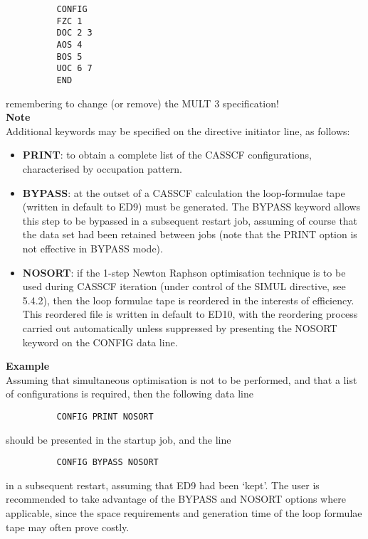 \documentclass[11pt,fleqn]{article}
\begin{document}
{
\footnotesize
\begin{verbatim}
          CONFIG
          FZC 1
          DOC 2 3
          AOS 4
          BOS 5
          UOC 6 7
          END
\end{verbatim}
}
remembering to change (or remove) the MULT 3 specification!\\

{\bf Note}\\

 Additional keywords may be specified on the directive
initiator line, as follows:
\begin{itemize}

\item {\bf PRINT}: to obtain a complete list of the CASSCF configurations,
characterised by occupation pattern.

\item {\bf BYPASS}: at the outset of a CASSCF calculation the loop-formulae tape
(written in default to ED9) must be generated. The BYPASS keyword
allows this step to be bypassed in a subsequent restart job, assuming
of course that the data set had been retained between jobs (note that
the PRINT option is not effective in BYPASS mode).

\item {\bf  NOSORT}: if the 1-step Newton Raphson optimisation technique
is to be used during CASSCF iteration (under control of
the SIMUL directive, see 5.4.2), then the loop formulae
tape is reordered in the interests of efficiency. This reordered
file is written in default to ED10, with the reordering
process carried out automatically unless suppressed by
presenting the NOSORT keyword on the CONFIG data line.
\end{itemize}

{\bf Example}\\

Assuming that simultaneous optimisation is not to be performed, and
that a list of configurations is required, then the
following data line

{
\footnotesize
\begin{verbatim}
          CONFIG PRINT NOSORT
\end{verbatim}
}
should be presented in the startup job, and the line
{
\footnotesize
\begin{verbatim}
          CONFIG BYPASS NOSORT
\end{verbatim}
}
in a subsequent restart, assuming that ED9 had been `kept'.
The user is recommended to take advantage of the BYPASS and NOSORT
options where applicable, since the space requirements and generation
time of the loop formulae tape may often prove costly.
\end{document}
